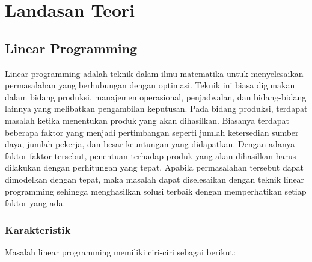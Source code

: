 \chapter{Landasan Teori}
\label{chap:teori}

\section{Linear Programming}
\label{linear_programming}

Linear programming adalah teknik dalam ilmu matematika untuk menyelesaikan permasalahan yang berhubungan dengan optimasi. Teknik ini biasa digunakan dalam bidang produksi, manajemen operasional, penjadwalan, dan bidang-bidang lainnya yang melibatkan pengambilan keputusan. Pada bidang produksi, terdapat masalah ketika menentukan produk yang akan dihasilkan. Biasanya terdapat beberapa faktor yang menjadi pertimbangan seperti jumlah ketersedian sumber daya, jumlah pekerja, dan besar keuntungan yang didapatkan. Dengan adanya faktor-faktor tersebut, penentuan terhadap produk yang akan dihasilkan harus dilakukan dengan perhitungan yang tepat. Apabila permasalahan tersebut dapat dimodelkan dengan tepat, maka masalah dapat diselesaikan dengan teknik linear programming sehingga menghasilkan solusi terbaik dengan memperhatikan setiap faktor yang ada.

\subsection{Karakteristik}
\label{karakteristik}

Masalah linear programming memiliki ciri-ciri sebagai berikut:


